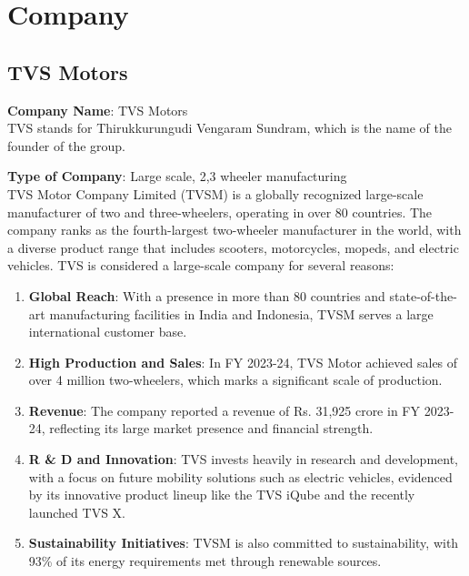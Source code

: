 \section{Company}

\subsection{TVS Motors}

\textbf{Company Name}: TVS Motors\\
TVS stands for Thirukkurungudi Vengaram Sundram, which is the name of the founder of the group.

\textbf{Type of Company}: Large scale, 2,3 wheeler manufacturing\\
TVS Motor Company Limited (TVSM) \cite{TVS_ANNUAL_REPORT} is a globally recognized large-scale manufacturer of two and three-wheelers, operating in over 80 countries. The company ranks as the fourth-largest two-wheeler manufacturer in the world, with a diverse product range that includes scooters, motorcycles, mopeds, and electric vehicles. TVS is considered a large-scale company for several reasons:
\begin{enumerate}
	\item \textbf{Global Reach}: With a presence in more than 80 countries and state-of-the-art manufacturing facilities in India and Indonesia, TVSM serves a large international customer base.

	\item \textbf{High Production and Sales}: In FY 2023-24, TVS Motor achieved sales of over 4 million two-wheelers, which marks a significant scale of production.

	\item \textbf{Revenue}: The company reported a revenue of Rs. 31,925 crore in FY 2023-24, reflecting its large market presence and financial strength.
	
	\item \textbf{R \& D and Innovation}: TVS invests heavily in research and development, with a focus on future mobility solutions such as electric vehicles, evidenced by its innovative product lineup like the TVS iQube and the recently launched TVS X.

	\item \textbf{Sustainability Initiatives}: TVSM is also committed to sustainability, with 93\% of its energy requirements met through renewable sources.
\end{enumerate}

